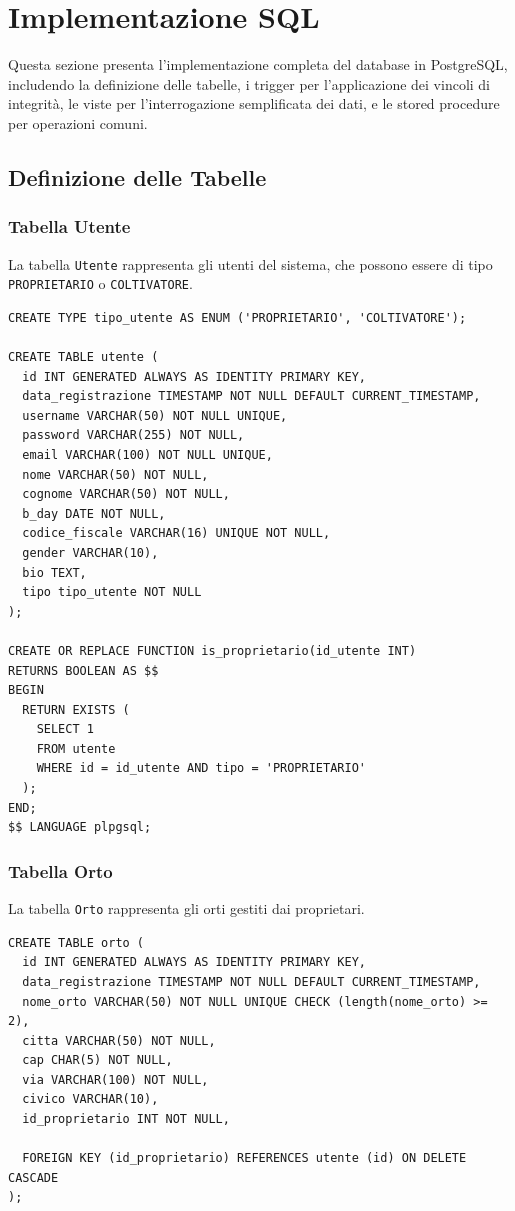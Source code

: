\documentclass[12pt,a4paper]{article}
\begin{document}
\newpage

\section{Implementazione SQL}

Questa sezione presenta l'implementazione completa del database in PostgreSQL, includendo la definizione delle tabelle, i trigger per l'applicazione dei vincoli di integrità, le viste per l'interrogazione semplificata dei dati, e le stored procedure per operazioni comuni.

\subsection{Definizione delle Tabelle}

\subsubsection{Tabella Utente}

La tabella \texttt{Utente} rappresenta gli utenti del sistema, che possono essere di tipo \texttt{PROPRIETARIO} o \texttt{COLTIVATORE}.

\begin{lstlisting}[style=sqlstyle]
CREATE TYPE tipo_utente AS ENUM ('PROPRIETARIO', 'COLTIVATORE');

CREATE TABLE utente (
  id INT GENERATED ALWAYS AS IDENTITY PRIMARY KEY,
  data_registrazione TIMESTAMP NOT NULL DEFAULT CURRENT_TIMESTAMP,
  username VARCHAR(50) NOT NULL UNIQUE,
  password VARCHAR(255) NOT NULL,
  email VARCHAR(100) NOT NULL UNIQUE,
  nome VARCHAR(50) NOT NULL,
  cognome VARCHAR(50) NOT NULL,
  b_day DATE NOT NULL,
  codice_fiscale VARCHAR(16) UNIQUE NOT NULL,
  gender VARCHAR(10),
  bio TEXT,
  tipo tipo_utente NOT NULL
);

CREATE OR REPLACE FUNCTION is_proprietario(id_utente INT)
RETURNS BOOLEAN AS $$
BEGIN 
  RETURN EXISTS (
    SELECT 1
    FROM utente
    WHERE id = id_utente AND tipo = 'PROPRIETARIO'
  );
END;
$$ LANGUAGE plpgsql;
\end{lstlisting}

\subsubsection{Tabella Orto}

La tabella \texttt{Orto} rappresenta gli orti gestiti dai proprietari.

\begin{lstlisting}[style=sqlstyle]
CREATE TABLE orto (
  id INT GENERATED ALWAYS AS IDENTITY PRIMARY KEY,
  data_registrazione TIMESTAMP NOT NULL DEFAULT CURRENT_TIMESTAMP,
  nome_orto VARCHAR(50) NOT NULL UNIQUE CHECK (length(nome_orto) >= 2),
  citta VARCHAR(50) NOT NULL,
  cap CHAR(5) NOT NULL,
  via VARCHAR(100) NOT NULL,
  civico VARCHAR(10),
  id_proprietario INT NOT NULL,
  
  FOREIGN KEY (id_proprietario) REFERENCES utente (id) ON DELETE CASCADE
);
\end{lstlisting}
\end{document}
